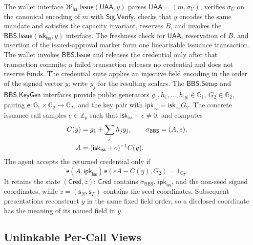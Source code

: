 \documentclass[letterpaper]{article}
\newcommand{\pair}{\mathsf{e}}
\newcommand{\Zp}{\mathbb{Z}_p}
\begin{document}
The wallet interface
\(\mathcal W_{\mathsf{iss}}.\mathsf{Issue}(\mathsf{UAA},y)\) parses
\(\mathsf{UAA}=(m,\sigma_U)\), verifies \(\sigma_U\) on the canonical encoding
of \(m\) with \(\mathsf{Sig.Verify}\), checks that \(y\) encodes the same
mandate and satisfies the capacity invariant, reserves \(B\), and invokes the
\(\mathsf{BBS.Issue}(\mathsf{isk}_{\mathsf{iss}},y)\) interface.
The freshness check for \(\mathsf{UAA}\), reservation of \(B\), and insertion
of the issued-approval marker form one linearizable issuance transaction. The
wallet invokes \(\mathsf{BBS.Issue}\) and releases the credential only after
that transaction commits; a failed transaction releases no credential and
does not reserve funds.
The credential suite applies an injective field encoding in the order of the
signed vector \(y\); write \(y_j\) for
the resulting scalars.  The \(\mathsf{BBS.Setup}\) and
\(\mathsf{BBS.KeyGen}\) interfaces provide public generators
\(g_1,h_1,\ldots,h_{|y|}\in\mathbb G_1\), \(G_2\in\mathbb G_2\), pairing
\(\pair:\mathbb G_1\times\mathbb G_2\to\mathbb G_T\), and the key pair with
\(\mathsf{ipk}_{\mathsf{iss}}=
\mathsf{isk}_{\mathsf{iss}}G_2\).  The concrete issuance call samples
\(e\in\Zp\) such that \(\mathsf{isk}_{\mathsf{iss}}+e\ne0\), and computes
\begin{equation}
\ifdefined\MMAAAITwoColumn
  \begin{aligned}
  C(y)&=g_1+\sum_j h_jy_j,\qquad \sigma_{\mathsf{BBS}}=(A,e),\\
  A&=(\mathsf{isk}_{\mathsf{iss}}+e)^{-1}C(y).
  \end{aligned}
\else
  C(y)=g_1+\sum_j h_jy_j,\qquad
  \sigma_{\mathsf{BBS}}=(A,e),\quad
  A=(\mathsf{isk}_{\mathsf{iss}}+e)^{-1}C(y).
\fi
\label{eq:ordinary-issue}
\end{equation}
The agent accepts the returned credential only if
\begin{equation}
  \pair(A,\mathsf{ipk}_{\mathsf{iss}})\,
  \pair(eA-C(y),G_2)=1_{\mathbb G_T}.
\label{eq:bbs-open-verify}
\end{equation}
It retains the state \((\mathsf{Cred},z)\): \(\mathsf{Cred}\)
contains \(\sigma_{\mathsf{BBS}}\), \(\mathsf{ipk}_{\mathsf{iss}}\), and the
non-seed signed coordinates, while
\(z=(\mathbf s_N,\mathbf s_F)\) contains the seed coordinates.  Subsequent
presentations reconstruct \(y\) in the same fixed field order, so a disclosed
coordinate has the meaning of its named field in \(y\).

\subsection{Unlinkable Per-Call Views}
\label{app:concrete-interface-algorithms}
\end{document}
